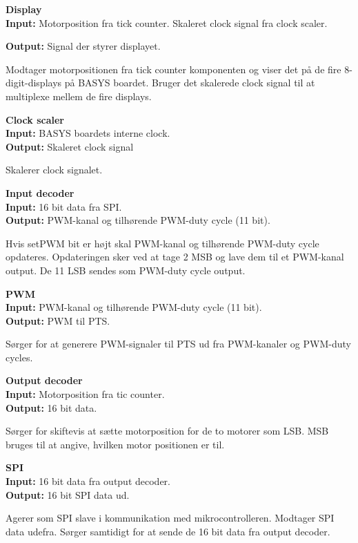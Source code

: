 \textbf{Display}\\
\textbf{Input:} Motorposition fra tick counter. Skaleret clock signal fra clock 
scaler.

\textbf{Output:} Signal der styrer displayet.

Modtager motorpositionen fra tick counter komponenten og viser det på de fire 8-digit-displays 
på BASYS boardet. Bruger det skalerede clock signal til at multiplexe mellem de 
fire displays.

\textbf{Clock scaler}\\
\textbf{Input:} BASYS boardets interne clock.\\
\textbf{Output:} Skaleret clock signal

Skalerer clock signalet.

\textbf{Input decoder}\\
\textbf{Input:} 16 bit data fra SPI.\\
\textbf{Output:} PWM-kanal og tilhørende PWM-duty cycle (11 bit).

Hvis setPWM bit er højt skal PWM-kanal og tilhørende PWM-duty cycle opdateres.
Opdateringen sker ved at tage 2 MSB og lave dem til et PWM-kanal output. De 11 
LSB sendes som PWM-duty cycle output.

\textbf{PWM}\\
\textbf{Input:} PWM-kanal og tilhørende PWM-duty cycle (11 bit).\\
\textbf{Output:} PWM til PTS.

Sørger for at generere PWM-signaler til PTS ud fra PWM-kanaler og PWM-duty cycles.

\textbf{Output decoder}\\
\textbf{Input:} Motorposition fra tic counter.\\
\textbf{Output:} 16 bit data.

Sørger for skiftevis at sætte motorposition for de to motorer som LSB.
MSB bruges til at angive, hvilken motor positionen er til.

\textbf{SPI}\\
\textbf{Input:} 16 bit data fra output decoder. \\%
\textbf{Output:} 16 bit SPI data ud.

Agerer som SPI slave i kommunikation med mikrocontrolleren.
Modtager SPI data udefra. Sørger samtidigt for at sende de 16 bit data fra output decoder.


